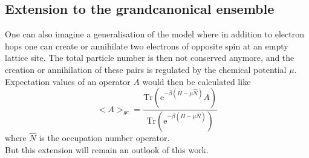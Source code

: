 \subsection*{Extension to the grandcanonical ensemble}
One can also imagine a generalisation of the model where in addition to electron hops one can create or annihilate two electrons of opposite spin at an empty lattice site. The total particle number is then not conserved anymore, and the creation or annihilation of these pairs is regulated by the chemical potential $\mu$. Expectation values of an operator $A$ would then be calculated like
\begin{equation}
<A>_{gc}=  \frac{\text{Tr}(\text{e}^{-\beta(H-\mu \hat{N}) }A)}{\text{Tr}(\text{e}^{-\beta (H-\mu \hat{N})})} \label{expvaluegc}
\end{equation}
where $\hat{N}$ is the occupation number operator.\\
But this extension will remain an outlook of this work.